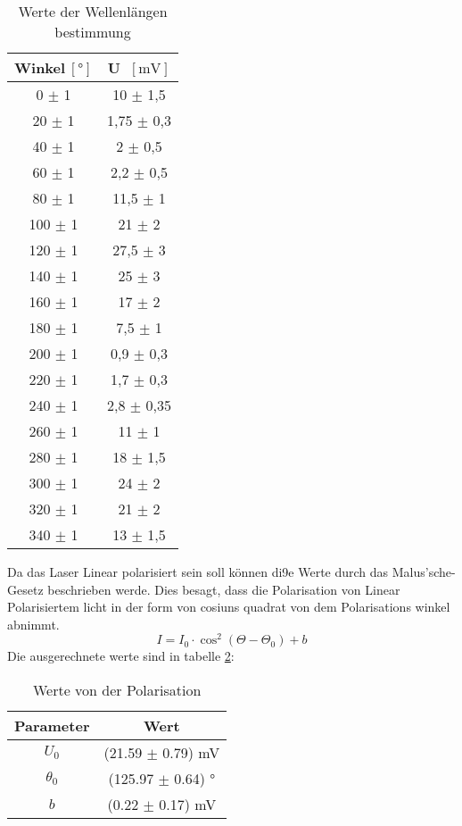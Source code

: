 \begin{table}[htbp]
    \centering
    \begin{tabular}{c|c}
        Winkel\(~[\text{°}]\) & U \(~[\text{mV}]\) \\
        \hline
        0 \(\pm\) 1 & 10 \(\pm\) 1,5 \\
        20 \(\pm\) 1 & 1,75 \(\pm\) 0,3 \\
        40 \(\pm\) 1 & 2 \(\pm\) 0,5 \\
        60 \(\pm\) 1 & 2,2 \(\pm\) 0,5 \\
        80 \(\pm\) 1 & 11,5 \(\pm\) 1 \\
        100 \(\pm\) 1 & 21 \(\pm\) 2 \\
        120 \(\pm\) 1 & 27,5 \(\pm\) 3 \\
        140 \(\pm\) 1 & 25 \(\pm\) 3 \\
        160 \(\pm\) 1 & 17 \(\pm\) 2 \\
        180 \(\pm\) 1 & 7,5 \(\pm\) 1 \\
        200 \(\pm\) 1 & 0,9 \(\pm\) 0,3 \\
        220 \(\pm\) 1 & 1,7 \(\pm\) 0,3 \\
        240 \(\pm\) 1 & 2,8 \(\pm\) 0,35 \\
        260 \(\pm\) 1 & 11 \(\pm\) 1 \\
        280 \(\pm\) 1 & 18 \(\pm\) 1,5 \\
        300 \(\pm\) 1 & 24 \(\pm\) 2 \\
        320 \(\pm\) 1 & 21 \(\pm\) 2 \\
        340 \(\pm\) 1 & 13 \(\pm\) 1,5 \\
    \end{tabular}
    \caption{Werte der Wellenlängen bestimmung}
    \label{tab:Wellenlänge}
\end{table}

Da das Laser Linear polarisiert sein soll können di9e Werte durch das Malus'sche-Gesetz beschrieben werde. 
Dies besagt, dass die Polarisation von Linear Polarisiertem licht in der form von cosiuns quadrat von dem Polarisations winkel abnimmt.
\begin{equation*}
    I = I_0 \cdot \cos^2(\Theta -\Theta_0) + b
\end{equation*}
Die ausgerechnete werte sind in tabelle \ref{tab:WertePol}:

\begin{table}[htbp]
    \centering
    \begin{tabular}{c|c}
        Parameter & Wert \\
        \hline
        $U_0$ & (21.59 \(\pm\) 0.79) mV \\
        $\theta_0$ & (125.97 \(\pm\) 0.64) ° \\
        $b$ & (0.22 \(\pm\) 0.17) mV \\
    \end{tabular}
    \caption{Werte von der Polarisation}
    \label{tab:WertePol}
\end{table}

